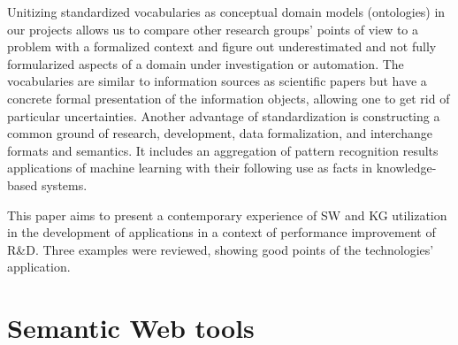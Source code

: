 \documentclass[
]{ceurart}
\begin{document}
Unitizing standardized vocabularies as conceptual domain models (ontologies) in our projects allows us to compare other research groups' points of view to a problem with a formalized context and figure out underestimated and not fully formularized aspects of a domain under investigation or automation. The vocabularies are similar to information sources as scientific papers but have a concrete formal presentation of the information objects, allowing one to get rid of particular uncertainties. Another advantage of standardization is constructing a common ground of research, development, data formalization, and interchange formats and semantics. It includes an aggregation of pattern recognition results applications of machine learning with their following use as facts in knowledge-based systems.

This paper aims to present a contemporary experience of SW and KG utilization in the development of applications in a context of performance improvement of R\&D.  Three examples were reviewed, showing good points of the technologies' application.


\section{Semantic Web tools}
\label{sec:sw-tools}
\end{document}
